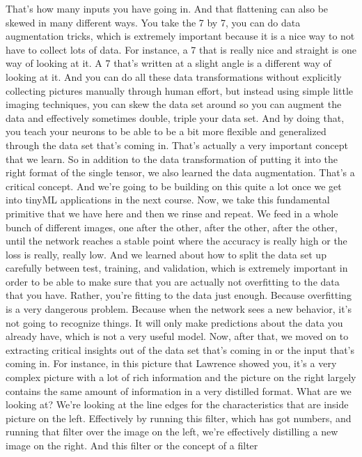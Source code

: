 That's how many inputs you have going in.
And that flattening can also be skewed in many different ways.
You take the 7 by 7, you can do data augmentation tricks,
which is extremely important because it is a nice way
to not have to collect lots of data.
For instance, a 7 that is really nice and straight
is one way of looking at it.
A 7 that's written at a slight angle is a different way of looking at it.
And you can do all these data transformations
without explicitly collecting pictures manually through human effort,
but instead using simple little imaging techniques,
you can skew the data set around so you can augment the data
and effectively sometimes double, triple your data set.
And by doing that, you teach your neurons
to be able to be a bit more flexible and generalized through the data set
that's coming in.
That's actually a very important concept that we learn.
So in addition to the data transformation of putting it
into the right format of the single tensor,
we also learned the data augmentation.
That's a critical concept.
And we're going to be building on this quite a lot once we
get into tinyML applications in the next course.
Now, we take this fundamental primitive that we have here
and then we rinse and repeat.
We feed in a whole bunch of different images, one after the other,
after the other, after the other, until the network reaches
a stable point where the accuracy is really high
or the loss is really, really low.
And we learned about how to split the data set up carefully between test,
training, and validation, which is extremely important in order
to be able to make sure that you are actually not overfitting to the data
that you have.
Rather, you're fitting to the data just enough.
Because overfitting is a very dangerous problem.
Because when the network sees a new behavior,
it's not going to recognize things.
It will only make predictions about the data you already have,
which is not a very useful model.
Now, after that, we moved on to extracting critical insights out
of the data set that's coming in or the input that's coming in.
For instance, in this picture that Lawrence showed you,
it's a very complex picture with a lot of rich information
and the picture on the right largely contains the same amount of information
in a very distilled format.
What are we looking at?
We're looking at the line edges for the characteristics that
are inside picture on the left.
Effectively by running this filter, which has got numbers,
and running that filter over the image on the left,
we're effectively distilling a new image on the right.
And this filter or the concept of a filter
